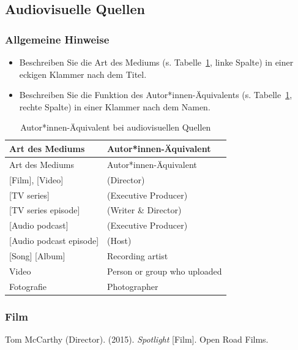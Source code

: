 \documentclass[
  letterpaper,
  DIV=11]{scrreprt}
\begin{document}
\subsection{Audiovisuelle Quellen}\label{audiovisuelle-quellen}

\subsubsection{\texorpdfstring{\textbf{Allgemeine
Hinweise}}{Allgemeine Hinweise}}\label{allgemeine-hinweise-4}

\begin{itemize}
\item
  Beschreiben Sie die Art des Mediums (s. Tabelle~\ref{tbl-audiovisual},
  linke Spalte) in einer eckigen Klammer nach dem Titel.
\item
  Beschreiben Sie die Funktion des Autor*innen-Äquivalents (s.
  Tabelle~\ref{tbl-audiovisual}, rechte Spalte) in einer Klammer nach
  dem Namen.
\end{itemize}

\begin{longtable}[]{@{}ll@{}}
\caption{Autor*innen-Äquivalent bei audiovisuellen
Quellen}\label{tbl-audiovisual}\tabularnewline
\toprule\noalign{}
Art des Mediums & Autor*innen-Äquivalent \\
\midrule\noalign{}
\endfirsthead
\toprule\noalign{}
Art des Mediums & Autor*innen-Äquivalent \\
\midrule\noalign{}
\endhead
\bottomrule\noalign{}
\endlastfoot
{[}Film{]}, {[}Video{]} & (Director) \\
{[}TV series{]} & (Executive Producer) \\
{[}TV series episode{]} & (Writer \& Director) \\
{[}Audio podcast{]} & (Executive Producer) \\
{[}Audio podcast episode{]} & (Host) \\
{[}Song{]} {[}Album{]} & Recording artist \\
Video & Person or group who uploaded \\
Fotografie & Photographer \\
\end{longtable}

\subsubsection{Film}\label{film}

Tom McCarthy (Director). (2015). \emph{Spotlight} {[}Film{]}. Open Road
Films.
\end{document}
